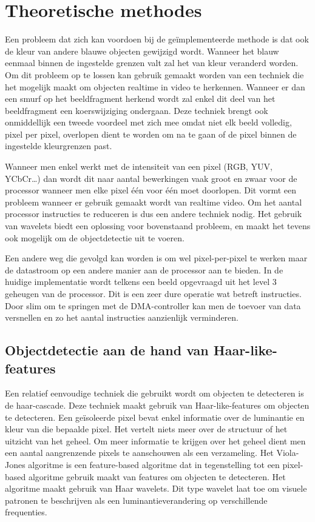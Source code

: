\chapter{Theoretische methodes}

	\par Een probleem dat zich kan voordoen bij de ge\"implementeerde methode is dat ook de kleur van andere blauwe objecten gewijzigd wordt. Wanneer het blauw eenmaal binnen de ingestelde grenzen valt zal het van kleur veranderd worden. Om dit probleem op te lossen kan gebruik gemaakt worden van een techniek die het mogelijk maakt om objecten realtime in video te herkennen. Wanneer er dan een smurf op het beeldfragment herkend wordt zal enkel dit deel van het beeldfragment een koerswijziging ondergaan. Deze techniek brengt ook onmiddellijk een tweede voordeel met zich mee omdat niet elk beeld volledig, pixel per pixel, overlopen dient te worden om na te gaan of de pixel binnen de ingestelde kleurgrenzen past. 

	\par Wanneer men enkel werkt met de intensiteit van een pixel (RGB, YUV, YCbCr\ldots) dan wordt dit naar aantal bewerkingen vaak groot en zwaar voor de processor wanneer men elke pixel \'e\'en voor \'e\'en moet doorlopen. Dit vormt een probleem wanneer er gebruik gemaakt wordt van realtime video. Om het aantal processor instructies te reduceren is dus een andere techniek nodig. Het gebruik van wavelets biedt een oplossing voor bovenstaand probleem, en maakt het tevens ook mogelijk om de objectdetectie uit te voeren.

	\par Een andere weg die gevolgd kan worden is om wel pixel-per-pixel te werken maar de datastroom op een andere manier aan de processor aan te bieden. In de huidige implementatie wordt telkens een beeld opgevraagd uit het level 3 geheugen van de processor. Dit is een zeer dure operatie wat betreft instructies. Door slim om te springen met de DMA-controller kan men de toevoer van data versnellen en zo het aantal instructies aanzienlijk verminderen. 

\section{Objectdetectie aan de hand van Haar-like-features}

	\par Een relatief eenvoudige techniek die gebruikt wordt om objecten te detecteren is de haar-cascade. Deze techniek maakt gebruik van Haar-like-features om objecten te detecteren. Een ge\"isoleerde pixel bevat enkel informatie over de luminantie en kleur van die bepaalde pixel. Het vertelt niets meer over de structuur of het uitzicht van het geheel. Om meer informatie te krijgen over het geheel dient men een aantal aangrenzende pixels te aanschouwen als een verzameling. Het Viola-Jones algoritme is een feature-based algoritme dat in tegenstelling tot een pixel-based algoritme gebruik maakt van features om objecten te detecteren. Het algoritme maakt gebruik van Haar wavelets. Dit type wavelet laat toe om visuele patronen te beschrijven als een luminantieverandering op verschillende frequenties.

